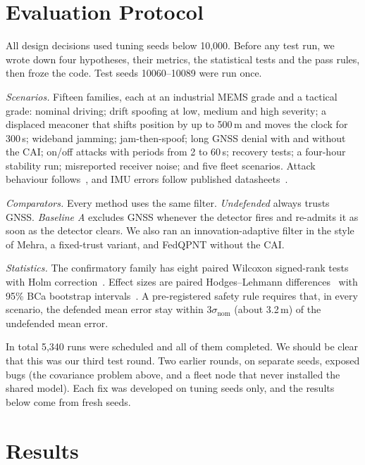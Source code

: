 \documentclass[conference]{IEEEtran}
\begin{document}
\section{Evaluation Protocol}

All design decisions used tuning seeds below 10{,}000. Before any test run, we wrote down four hypotheses, their metrics, the statistical tests and the pass rules, then froze the code. Test seeds 10060--10089 were run once.

\textit{Scenarios.} Fifteen families, each at an industrial MEMS grade and a tactical grade: nominal driving; drift spoofing at low, medium and high severity; a displaced meaconer that shifts position by up to 500\,m and moves the clock for 300\,s; wideband jamming; jam-then-spoof; long GNSS denial with and without the CAI; on/off attacks with periods from 2 to 60\,s; recovery tests; a four-hour stability run; misreported receiver noise; and five fleet scenarios. Attack behaviour follows~\cite{psiaki2016gnss,rados2024recent}, and IMU errors follow published datasheets~\cite{adi2017adis16470,honeywell2025hg1700}.

\textit{Comparators.} Every method uses the same filter. \emph{Undefended} always trusts GNSS. \emph{Baseline A} excludes GNSS whenever the detector fires and re-admits it as soon as the detector clears. We also ran an innovation-adaptive filter in the style of Mehra, a fixed-trust variant, and FedQPNT without the CAI.

\textit{Statistics.} The confirmatory family has eight paired Wilcoxon signed-rank tests~\cite{wilcoxon1945individual} with Holm correction~\cite{holm1979simple}. Effect sizes are paired Hodges--Lehmann differences~\cite{hodges1963estimates} with 95\% BCa bootstrap intervals~\cite{efron1987better}. A pre-registered safety rule requires that, in every scenario, the defended mean error stay within $3\sigma_{\text{nom}}$ (about 3.2\,m) of the undefended mean error.

In total 5{,}340 runs were scheduled and all of them completed. We should be clear that this was our third test round. Two earlier rounds, on separate seeds, exposed bugs (the covariance problem above, and a fleet node that never installed the shared model). Each fix was developed on tuning seeds only, and the results below come from fresh seeds.

\section{Results}
\end{document}
